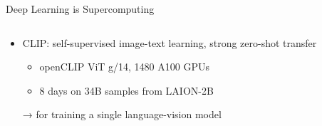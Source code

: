 \begin{frame}{Deep Learning is Supercomputing}
\protect\hypertarget{deep-learning-is-supercomputing-8}{}
\begin{columns}[T]
\begin{column}{0.4\textwidth}
\begin{itemize}
\tightlist
\item
  CLIP: self-supervised image-text learning, strong zero-shot transfer

  \begin{itemize}
  \tightlist
  \item
    openCLIP ViT g/14, 1480 A100 GPUs
  \item
    8 days on 34B samples from LAION-2B
  \end{itemize}

  → for training a single language-vision model
\end{itemize}
\end{column}

\begin{column}{0.6\textwidth}
\vspace*{2cm}
\end{column}
\end{columns}
\end{frame}

